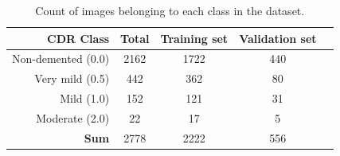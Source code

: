 \documentclass{kththesis}
\begin{document}
\begin{table}[h]
  \begin{center}
    \caption{Count of images belonging to each class in the dataset.\label{tab:dataset_contents}}
    \begin{tabular}{r|cccc}
      \textbf{CDR Class} & \textbf{Total} & \textbf{Training set} & \textbf{Validation set} \\
      \toprule
      Non-demented (0.0) & 2162 & 1722 & 440 \\
      Very mild (0.5) & 442 & 362 & 80 \\
      Mild (1.0) & 152 & 121 & 31 \\
      Moderate (2.0) & 22 & 17 & 5 \\
      \bottomrule
      \textbf{Sum} & 2778 & 2222 & 556 \\
    \end{tabular}
  \end{center}
\end{table}

\newpage
\end{document}
